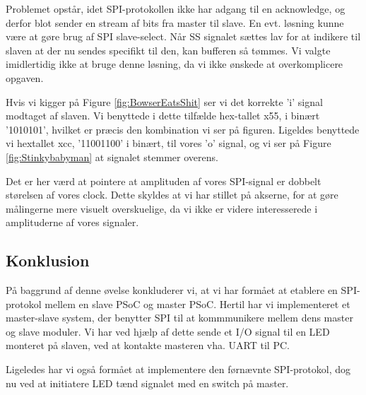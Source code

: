 \documentclass[../main.tex]{subfiles}
\begin{document}
Problemet opstår, idet SPI-protokollen ikke har adgang til en acknowledge, og derfor blot sender en stream af bits fra master til slave. En evt. løsning kunne være at gøre brug af 
SPI slave-select. Når SS signalet sættes lav for at indikere til slaven at der nu sendes specifikt til den, kan bufferen så tømmes. Vi valgte imidlertidig ikke at bruge denne løsning,
da vi ikke ønskede at overkomplicere opgaven.

Hvis vi kigger på Figure \ref{fig:BowserEatsShit} ser vi det korrekte 'i' signal modtaget af slaven. Vi benyttede i dette tilfælde hex-tallet x55, i binært '1010101', hvilket er præcis 
den kombination vi ser på figuren. Ligeldes benyttede vi hextallet xcc, '11001100' i binært, til vores 'o' signal, og vi ser på Figure \ref{fig:Stinkybabyman} at signalet stemmer overens.

Det er her værd at pointere at amplituden af vores SPI-signal er dobbelt størelsen af vores clock. Dette skyldes at vi har stillet på akserne, for at gøre målingerne mere visuelt
 overskuelige, da vi ikke er videre interesserede i amplituderne af vores signaler.

\subsection{Konklusion}
På baggrund af denne øvelse konkluderer vi, at vi har formået at etablere en SPI-protokol mellem en slave PSoC og master PSoC. 
Hertil har vi implementeret et master-slave system, der benytter SPI til at kommmunikere mellem dens master og slave moduler. Vi har ved hjælp af dette sende et I/O signal til en 
LED monteret på slaven, ved at kontakte masteren vha. UART til PC.

Ligeledes har vi også formået at implementere den førnævnte SPI-protokol, dog nu ved at initiatere LED tænd signalet med en switch på master.
\end{document}
